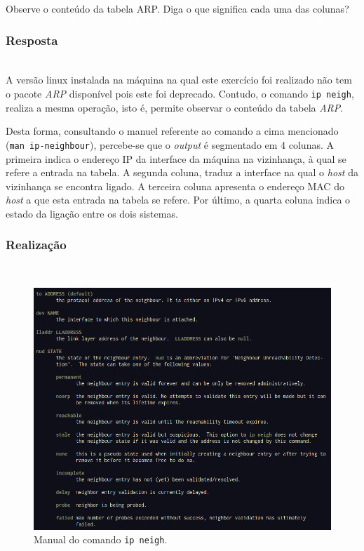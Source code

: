 \documentclass{llncs}
\begin{document}
Observe o conteúdo da tabela ARP. Diga o que significa cada uma das colunas?

\subsubsection{Resposta}\rule[-10pt]{0pt}{10pt}\\

A versão linux instalada na máquina na qual este exercício foi realizado não tem o pacote \textit{ARP} disponível pois este foi deprecado. Contudo, o comando \texttt{ip neigh}, realiza a mesma operação, isto é, permite observar o conteúdo da tabela \textit{ARP}.

Desta forma, consultando o manuel referente ao comando a cima mencionado (\texttt{man ip-neighbour}), percebe-se que o \textit{output} é segmentado em 4 colunas. A primeira indica o endereço IP da interface da máquina na vizinhança, à qual se refere a entrada na tabela. A segunda coluna, traduz a interface na qual o \textit{host} da vizinhança se encontra ligado. A terceira coluna apresenta o endereço MAC do \textit{host} a que esta entrada na tabela se refere. Por último, a quarta coluna indica o estado da ligação entre os dois sistemas.

\subsubsection{Realização}\rule[-10pt]{0pt}{10pt}\\

\begin{figure}
  \begin{center}
	  \includegraphics[scale=0.5]{./imagens/ip_neigh.png} 
  \end{center}
	\caption{Manual do comando \texttt{ip neigh}.}
  \label{fig:ip_neigh}
\end{figure} 
\end{document}
